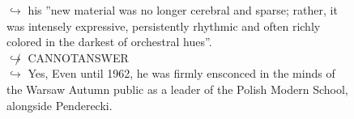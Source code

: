 \documentclass[11pt,a4paper, onecolumn]{article}
\begin{document}
\begin{figure}[t]
\begin{tcolorbox}[boxsep=0pt,left=5pt,right=0pt,top=2pt,colback = yellow!5]
\begin{dialogue}
\colorbox{pink!25}{$\hookrightarrow$}
{ his ''new material was no longer cerebral and sparse; rather, it was intensely expressive, persistently rhythmic and often richly colored in the darkest of orchestral hues''. }
\\
\colorbox{pink!25}{$\not\hookrightarrow$}
{ CANNOTANSWER }
\\
\colorbox{pink!25}{$\hookrightarrow$}
\colorbox{red!25}{Yes,}
{ Even until 1962, he was firmly ensconced in the minds of the Warsaw Autumn public as a leader of the Polish Modern School, alongside Penderecki. }
\\
 \end{dialogue}\end{tcolorbox}\end{figure}
\end{document}
